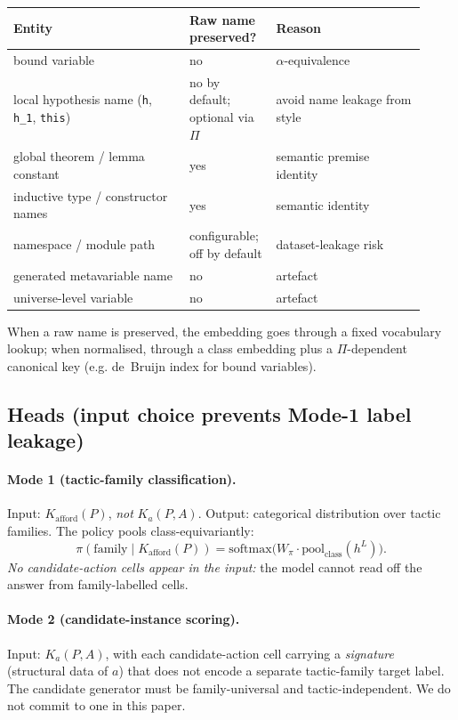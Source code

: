 \documentclass[11pt]{article}
\theoremstyle{definition}
\theoremstyle{plain}
\newcommand{\softmax}{\mathrm{softmax}}
\newcommand{\pool}{\mathrm{pool}}
\newcommand{\Kafford}{K_{\mathrm{afford}}}
\begin{document}
\begin{center}
\begin{tabular}{p{0.40\linewidth} p{0.18\linewidth} p{0.34\linewidth}}
\toprule
\textbf{Entity} & \textbf{Raw name preserved?} & \textbf{Reason} \\
\midrule
bound variable & no & $\alpha$-equivalence \\
local hypothesis name (\texttt{h}, \texttt{h\_1}, \texttt{this}) & no by default; optional via $\Pi$ & avoid name leakage from style \\
global theorem / lemma constant & yes & semantic premise identity \\
inductive type / constructor names & yes & semantic identity \\
namespace / module path & configurable; off by default & dataset-leakage risk \\
generated metavariable name & no & artefact \\
universe-level variable & no & artefact \\
\bottomrule
\end{tabular}
\end{center}

When a raw name is preserved, the embedding goes through a fixed vocabulary lookup; when normalised, through a class embedding plus a $\Pi$-dependent canonical key (e.g. de~Bruijn index for bound variables).

\subsection{Heads (input choice prevents Mode-1 label leakage)}\label{sec:heads}

\paragraph{Mode 1 (tactic-family classification).} Input: $\Kafford(P)$, \emph{not} $K_a(P, A)$. Output: categorical distribution over tactic families. The policy pools class-equivariantly:
\[
\pi(\text{family} \mid \Kafford(P)) = \softmax\bigl(W_\pi \cdot \pool_{\mathrm{class}}(h^L)\bigr).
\]
\emph{No candidate-action cells appear in the input:} the model cannot read off the answer from family-labelled cells.

\paragraph{Mode 2 (candidate-instance scoring).} Input: $K_a(P, A)$, with each candidate-action cell carrying a \emph{signature} (structural data of $a$) that does not encode a separate tactic-family target label. The candidate generator must be family-universal and tactic-independent. We do not commit to one in this paper.
\end{document}
